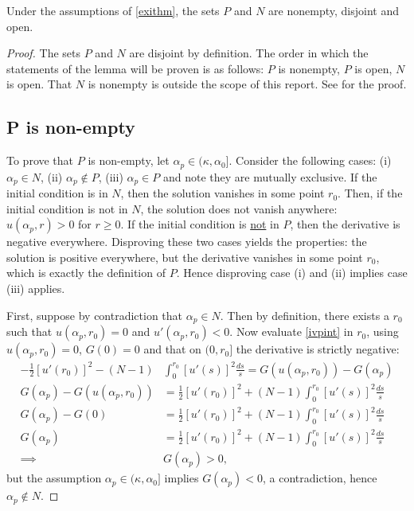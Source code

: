 \begin{lemma}\label{lem} Under the assumptions of \cref{exithm}, the sets $P$ and $N$ are nonempty, disjoint and open.
\end{lemma}
\begin{proof}
The sets $P$ and $N$ are disjoint by definition. The order in which the statements of the lemma will be proven is as follows: $P$ is nonempty, $P$ is open, $N$ is open. That $N$ is nonempty is outside the scope of this report. See \cite{ber} for the proof.

\subsection*{P is non-empty}
To prove that $P$ is non-empty, let $\alpha_p\in(\kappa,\alpha_0]$.
Consider the following cases: (i) $\alpha_p\in N$, (ii) $\alpha_p\notin P$, (iii) $\alpha_p\in P$ and note they are mutually exclusive. If the initial condition is in $N$, then the solution vanishes in some point $r_0$. Then, if the initial condition is not in $N$, the solution does not vanish anywhere: $u(\alpha_p,r)>0$ for $r\geq0$. If the initial condition is \underline{not} in $P$, then the derivative is negative everywhere. Disproving these two cases yields the properties: the solution is positive everywhere, but the derivative vanishes in some point $r_0$, which is exactly the definition of $P$. %
Hence disproving case (i) and (ii) implies case (iii) applies.

First, suppose by contradiction that $\alpha_p\in N$. Then by definition, there exists a $r_0$ such that $u(\alpha_p,r_0)=0$ and $u'(\alpha_p,r_0)<0$. Now evaluate \eqref{ivpint} in $r_0$, using $u(\alpha_p,r_0)=0$, $G(0)=0$ and that on $(0,r_0]$ the derivative is strictly negative:
\begin{align*}-\frac{1}{2}[u'(r_0)]^2-(N-1)&\int_0^{r_0}[u'(s)]^2\frac{ds}{s}=G(u(\alpha_p,r_0))-G(\alpha_p)\\
G(\alpha_p)-G(u(\alpha_p,r_0))&=\frac{1}{2}[u'(r_0)]^2+(N-1)\int_0^{r_0}[u'(s)]^2\frac{ds}{s}\\
G(\alpha_p)-G(0)&=\frac{1}{2}[u'(r_0)]^2+(N-1)\int_0^{r_0}[u'(s)]^2\frac{ds}{s}\\
G(\alpha_p)&=\frac{1}{2}[u'(r_0)]^2+(N-1)\int_0^{r_0}[u'(s)]^2\frac{ds}{s}\\
    \implies &G(\alpha_p)>0,
\end{align*}
but the assumption $\alpha_p\in(\kappa,\alpha_0]$ implies $G(\alpha_p)<0$, a contradiction, hence $\alpha_p\notin N$.


\end{proof}
